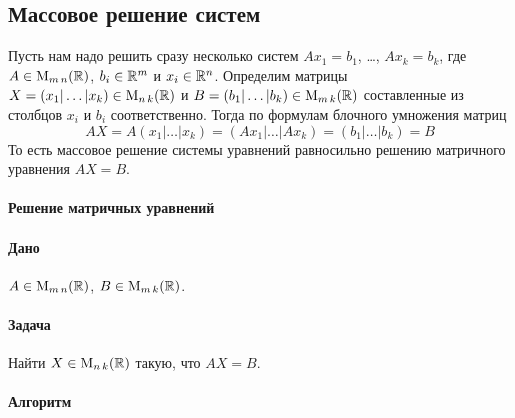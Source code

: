 \subsection{Массовое решение систем}

Пусть нам надо решить сразу несколько систем $Ax_1 = b_1$, \ldots, $Ax_k = b_k$, где $A\in \operatorname{M}_{m\,n}(\mathbb R)$, $b_i\in \mathbb R^{m}$ и $x_i\in \mathbb R^{n}$.
Определим матрицы $X = (x_1|\ldots|x_k)\in \operatorname{M}_{n\,k}(\mathbb R)$ и $B = (b_1|\ldots|b_k)\in \operatorname{M}_{m\,k}(\mathbb R)$ составленные из столбцов $x_i$ и $b_i$ соответственно.
Тогда по формулам блочного умножения матриц
\[
AX = A(x_1|\ldots|x_k) = (Ax_1|\ldots|Ax_k) = (b_1|\ldots|b_k) = B
\]
То есть массовое решение системы уравнений равносильно решению матричного уравнения $AX = B$.

\paragraph{Решение матричных уравнений}

\paragraph{Дано}

$A\in \operatorname{M}_{m\,n}(\mathbb R)$, $B\in \operatorname{M}_{m\,k}(\mathbb R)$.

\paragraph{Задача}

Найти $X\in \operatorname{M}_{n\,k}(\mathbb R)$ такую, что $AX = B$.

\paragraph{Алгоритм}

